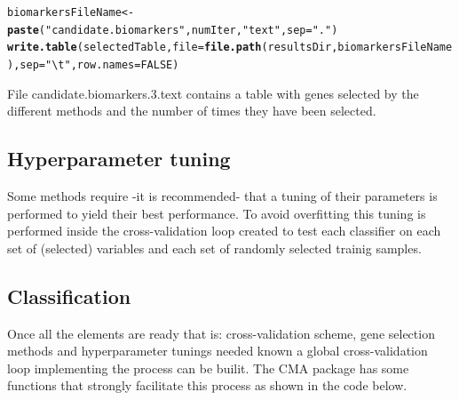 \documentclass{article}\usepackage[]{graphicx}\usepackage[]{color}
\makeatletter
\newcommand{\hlnum}[1]{\textcolor[rgb]{0.686,0.059,0.569}{#1}}%
\newcommand{\hlstr}[1]{\textcolor[rgb]{0.192,0.494,0.8}{#1}}%
\newcommand{\hlstd}[1]{\textcolor[rgb]{0.345,0.345,0.345}{#1}}%
\newcommand{\hlkwb}[1]{\textcolor[rgb]{0.69,0.353,0.396}{#1}}%
\newcommand{\hlkwc}[1]{\textcolor[rgb]{0.333,0.667,0.333}{#1}}%
\newcommand{\hlkwd}[1]{\textcolor[rgb]{0.737,0.353,0.396}{\textbf{#1}}}%
\newenvironment{kframe}{%
 \def\at@end@of@kframe{}%
 \ifinner\ifhmode%
  \def\at@end@of@kframe{\end{minipage}}%
  \begin{minipage}{\columnwidth}%
 \fi\fi%
 \def\FrameCommand##1{\hskip\@totalleftmargin \hskip-\fboxsep
 \colorbox{shadecolor}{##1}\hskip-\fboxsep
     \hskip-\linewidth \hskip-\@totalleftmargin \hskip\columnwidth}%
 \MakeFramed {\advance\hsize-\width
   \@totalleftmargin\z@ \linewidth\hsize
   \@setminipage}}%
 {\par\unskip\endMakeFramed%
 \at@end@of@kframe}
\newenvironment{knitrout}{}{} %
\makeatother
\begin{document}
\begin{knitrout}
\begin{kframe}
{\ttfamily\noindent\bfseries\color{errorcolor}{\#\# Error in eval(expr, envir, enclos): object 'x' not found}}\begin{alltt}
\hlstd{biomarkersFileName} \hlkwb{<-} \hlkwd{paste}\hlstd{(}\hlstr{"candidate.biomarkers"}\hlstd{, numIter,} \hlstr{"text"}\hlstd{,} \hlkwc{sep}\hlstd{=}\hlstr{"."}\hlstd{)}
\hlkwd{write.table}\hlstd{(selectedTable,} \hlkwc{file}\hlstd{=}\hlkwd{file.path}\hlstd{(resultsDir, biomarkersFileName),} \hlkwc{sep}\hlstd{=}\hlstr{"\textbackslash{}t"}\hlstd{,} \hlkwc{row.names}\hlstd{=}\hlnum{FALSE}\hlstd{)}
\end{alltt}


{\ttfamily\noindent\bfseries\color{errorcolor}{\#\# Error in is.data.frame(x): object 'selectedTable' not found}}\end{kframe}
\end{knitrout}

File candidate.biomarkers.3.text contains a table with genes selected by the different methods and the number of times they have been selected.

\subsection{Hyperparameter tuning}

Some methods require -it is recommended- that a tuning of their parameters is performed to yield their best performance.
To avoid overfitting this tuning is performed inside the cross-validation loop created to test each classifier on each set of (selected) variables and each set of randomly selected trainig samples.

\subsection{Classification}

Once all the elements are ready that is: cross-validation scheme, gene selection methods and hyperparameter tunings needed known a global cross-validation loop implementing the process can be builit. The CMA package has some functions that strongly facilitate this process as shown in the code below.
\end{document}
